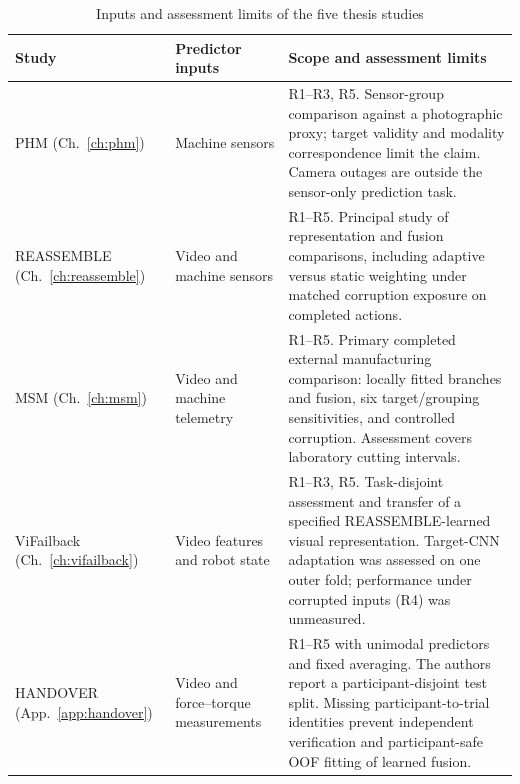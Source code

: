 \begin{table}[htbp]
  \centering
  \caption{Inputs and assessment limits of the five thesis studies}
  \label{tab:fusion-study-scope}
  \begingroup
  \singlespacing\small
  \setlength{\tabcolsep}{4pt}
  \renewcommand{\arraystretch}{1.28}
  \begin{tabularx}{\linewidth}{@{}P{.22\linewidth} P{.23\linewidth} Y@{}}
    \toprule
    \textbf{Study} & \textbf{Predictor inputs} & \textbf{Scope and assessment limits}\\
    \midrule
    PHM (Ch.~\ref{ch:phm})
      & Machine sensors
      & R1--R3, R5. Sensor-group comparison against a photographic proxy;
        target validity and modality correspondence limit the claim.
        Camera outages are outside the sensor-only prediction task.\\
    REASSEMBLE (Ch.~\ref{ch:reassemble})
      & Video and machine sensors
      & R1--R5. Principal study of representation and fusion comparisons,
        including adaptive versus static weighting under matched corruption
        exposure on completed actions.\\
    MSM (Ch.~\ref{ch:msm})
      & Video and machine telemetry
      & R1--R5. Primary completed external manufacturing comparison:
        locally fitted branches and fusion, six target/grouping sensitivities,
        and controlled corruption. Assessment covers laboratory cutting intervals.\\
    ViFailback (Ch.~\ref{ch:vifailback})
      & Video features and robot state
      & R1--R3, R5. Task-disjoint assessment and transfer of a specified
        REASSEMBLE-learned visual representation. Target-CNN adaptation was
        assessed on one outer fold; performance under corrupted inputs (R4) was
        unmeasured.\\
    HANDOVER (App.~\ref{app:handover})
      & Video and force--torque measurements
      & R1--R5 with unimodal predictors and fixed averaging. The authors report
        a participant-disjoint test split. Missing participant-to-trial identities
        prevent independent verification and participant-safe OOF fitting of
        learned fusion.\\
    \bottomrule
  \end{tabularx}
  \endgroup
\end{table}


